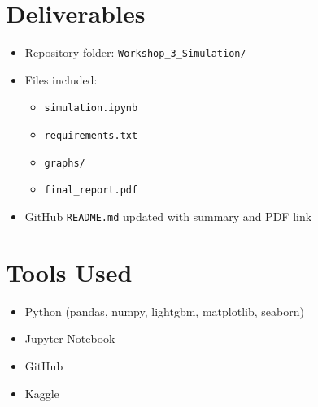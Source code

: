 \documentclass[12pt]{article}
\begin{document}
	\section{Deliverables}
	\begin{itemize}
		\item Repository folder: \texttt{Workshop\_3\_Simulation/}
		\item Files included:
		\begin{itemize}
			\item \texttt{simulation.ipynb}
			\item \texttt{requirements.txt}
			\item \texttt{graphs/}
			\item \texttt{final\_report.pdf}
		\end{itemize}
		\item GitHub \texttt{README.md} updated with summary and PDF link
	\end{itemize}
	
	\section*{Tools Used}
	\begin{itemize}
		\item Python (pandas, numpy, lightgbm, matplotlib, seaborn)
		\item Jupyter Notebook
		\item GitHub
		\item Kaggle
	\end{itemize}
	
\end{document}
